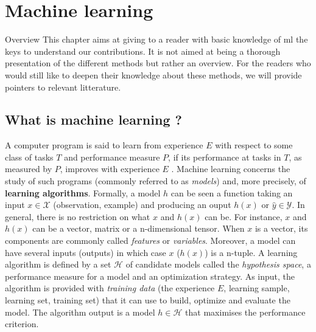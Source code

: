 \chapter{Machine learning}
\label{chap:backml}

\begin{overview}{Overview}
This chapter aims at giving to a reader with basic knowledge of \acrshort{ml} the keys to understand our contributions. It is not aimed at being a thorough presentation of the different methods but rather an overview. For the readers who would still like to deepen their knowledge about these methods, we will provide pointers to relevant litterature.
\end{overview}

\section{What is machine learning ?} 
\label{sec:backml:whatisml}

A computer program is said to learn from experience $E$ with respect to some class of tasks $T$ and performance measure $P$, if its performance at tasks in $T$, as measured by $P$, improves with experience $E$ \parencite{mitchell1997machine}. Machine learning concerns the study of such programs (commonly referred to as \textit{models}) and, more precisely, of \textbf{learning algorithms}. Formally, a model $h$ can be seen a function taking an input $x \in \mathcal{X}$ (\aka observation, example) and producing an ouput $h(x)$ or $\hat{y} \in \mathcal{Y}$. In general, there is no restriction on what $x$ and $h(x)$ can be. For instance, $x$ and $h(x)$ can be a vector, matrix or a n-dimensional tensor. When $x$ is a vector, its components are commonly called \textit{features} or \textit{variables}. Moreover, a model can have several inputs (\resp outputs) in which case $x$ (\resp $h(x)$) is a n-tuple. A learning algorithm is defined by a set $\mathcal{H}$ of candidate models called the \textit{hypothesis space}, a performance measure for a model and an optimization strategy. As input, the algorithm is provided with \textit{training data} (the experience $E$, \aka learning sample, learning set, training set) that it can use to build, optimize and evaluate the model. The algorithm output is a model $h \in \mathcal{H}$ that maximises the performance criterion. 

